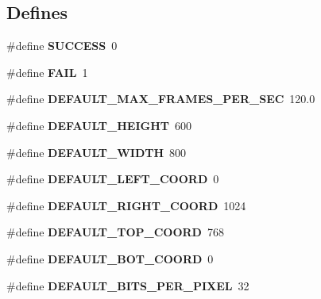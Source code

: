 \subsection*{Defines}
\begin{CompactItemize}
\item 
\hypertarget{group__userclasses_ga90cac659d18e8ef6294c7ae337f6b58}{
\#define \textbf{SUCCESS}~0}
\label{group__userclasses_ga90cac659d18e8ef6294c7ae337f6b58}

\item 
\hypertarget{group__userclasses_gbb508ea8227673f419e9fe3a86c30d8e}{
\#define \textbf{FAIL}~1}
\label{group__userclasses_gbb508ea8227673f419e9fe3a86c30d8e}

\item 
\hypertarget{group__userclasses_gbaf7eb47bec4fab9a0e152c7a9c3b48c}{
\#define \textbf{DEFAULT\_\-MAX\_\-FRAMES\_\-PER\_\-SEC}~120.0}
\label{group__userclasses_gbaf7eb47bec4fab9a0e152c7a9c3b48c}

\item 
\hypertarget{group__userclasses_g1879f9e5604a01f0983829846001ab23}{
\#define \textbf{DEFAULT\_\-HEIGHT}~600}
\label{group__userclasses_g1879f9e5604a01f0983829846001ab23}

\item 
\hypertarget{group__userclasses_g93493eb8fae5549bd5be67f3449245e0}{
\#define \textbf{DEFAULT\_\-WIDTH}~800}
\label{group__userclasses_g93493eb8fae5549bd5be67f3449245e0}

\item 
\hypertarget{group__userclasses_gc72259e91b1c7a3f15a292d841ac22ea}{
\#define \textbf{DEFAULT\_\-LEFT\_\-COORD}~0}
\label{group__userclasses_gc72259e91b1c7a3f15a292d841ac22ea}

\item 
\hypertarget{group__userclasses_ge309cab29966adfc05410c143b063108}{
\#define \textbf{DEFAULT\_\-RIGHT\_\-COORD}~1024}
\label{group__userclasses_ge309cab29966adfc05410c143b063108}

\item 
\hypertarget{group__userclasses_g333911404914f34d154c6a9c3d24bee8}{
\#define \textbf{DEFAULT\_\-TOP\_\-COORD}~768}
\label{group__userclasses_g333911404914f34d154c6a9c3d24bee8}

\item 
\hypertarget{group__userclasses_g716e03037302df1c8bfc88af0296e4f7}{
\#define \textbf{DEFAULT\_\-BOT\_\-COORD}~0}
\label{group__userclasses_g716e03037302df1c8bfc88af0296e4f7}

\item 
\hypertarget{group__userclasses_g3b9b27199f07c31550400bb303d0a80f}{
\#define \textbf{DEFAULT\_\-BITS\_\-PER\_\-PIXEL}~32}
\label{group__userclasses_g3b9b27199f07c31550400bb303d0a80f}


\end{CompactItemize}
